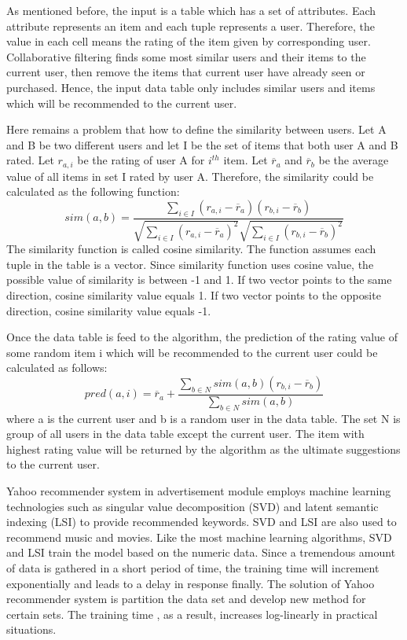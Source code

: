 \documentclass[sigconf]{acmart}
\begin{document}
\par
As mentioned before, the input is a table which has a set of attributes. Each attribute represents an item and each tuple represents a user. Therefore, the value in each cell means the rating of the item given by corresponding user. Collaborative filtering finds some most similar users and their items to the current user, then remove the items that current user have already seen or purchased. Hence, the input data table only includes similar users and items which will be recommended to the current user.
\par
Here remains a problem that how to define the similarity between users. Let A and B be two different users and let I be the set of items that both user A and B rated. Let $r_{a,i}$ be the rating of user A for $i^{th}$ item. Let $\overline{r}_a$ and $\overline{r}_b$ be the average value of all items in set I rated by user A. Therefore, the similarity could be calculated as the following function\cite{Reco2}:
\begin{displaymath}
sim(a,b)=\frac{\sum_{i \in I}(r_{a,i} - \overline{r}_a)(r_{b,i} - \overline{r}_b)}{\sqrt{\sum_{i \in I}(r_{a,i} - \overline{r}_a)^{2}}\sqrt{\sum_{i \in I}(r_{b,i} - \overline{r}_b)^{2}}}
\end{displaymath}
The similarity function is called cosine similarity. The function assumes each tuple in the table is a vector. Since similarity function uses cosine value, the possible value of similarity is between -1 and 1. If two vector points to the same direction, cosine similarity value equals 1. If two vector points to the opposite direction, cosine similarity value equals -1. 
\par
Once the data table is feed to the algorithm, the prediction of the rating value of some random item i which will be recommended to the current user could be calculated as follows\cite{Reco2}:
\begin{displaymath}
pred(a,i)=\overline{r}_a + \frac{\sum_{b \in N}sim(a,b)(r_{b,i} - \overline{r}_b)}{\sum_{b \in N}sim(a,b)}
\end{displaymath}
where a is the current user and b is a random user in the data table. The set N is group of all users in the data table except the current user. The item with highest rating value will be returned by the algorithm as the ultimate suggestions to the current user.  
\par
Yahoo recommender system in advertisement module employs machine learning technologies such as singular value decomposition (SVD) and latent semantic indexing (LSI) to provide recommended keywords. SVD and LSI are also used to recommend music and movies\cite{Yahoo}. Like the most machine learning algorithms, SVD and LSI train the model based on the numeric data. Since a tremendous amount of data is gathered in a short period of time, the training time will increment exponentially and leads to a delay in response finally. The solution of Yahoo recommender system is partition the data set and develop new method for certain sets. The training time , as a result, increases log-linearly in practical situations\cite{Yahoo}.
\end{document}
